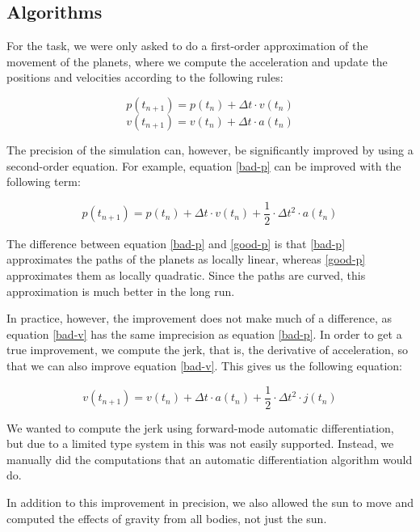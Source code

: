 \documentclass[a4paper]{article}
\begin{document}
\subsection{Algorithms}

For the task, we were only asked to do a first-order approximation of the movement of the planets, where we compute the acceleration and update the positions and velocities according to the following rules:

\begin{equation} \label{bad-p}
p(t_{n+1}) = p(t_n) + \Delta t \cdot v(t_n)
\end{equation}
\begin{equation} \label{bad-v}
v(t_{n+1}) = v(t_n) + \Delta t \cdot a(t_n)
\end{equation}

The precision of the simulation can, however, be significantly improved by using a second-order equation. For example, equation \ref{bad-p} can be improved with the following term:

\begin{equation} \label{good-p}
p(t_{n+1}) = p(t_n) + \Delta t \cdot v(t_n) + \frac{1}{2} \cdot \Delta t^2 \cdot a(t_n)
\end{equation}

The difference between equation \ref{bad-p} and \ref{good-p} is that \ref{bad-p} approximates the paths of the planets as locally linear, whereas \ref{good-p} approximates them as locally quadratic. Since the paths are curved, this approximation is much better in the long run.

In practice, however, the improvement does not make much of a difference, as equation \ref{bad-v} has the same imprecision as equation \ref{bad-p}. In order to get a true improvement, we compute the jerk, that is, the derivative of acceleration, so that we can also improve equation \ref{bad-v}. This gives us the following equation:

\begin{equation} \label{good-v}
v(t_{n+1}) = v(t_n) + \Delta t \cdot a(t_n) + \frac{1}{2} \cdot \Delta t^2 \cdot j(t_n)
\end{equation}

We wanted to compute the jerk using forward-mode automatic differentiation, but due to a limited type system in \Fsh this was not easily supported. Instead, we manually did the computations that an automatic differentiation algorithm would do.

In addition to this improvement in precision, we also allowed the sun to move and computed the effects of gravity from all bodies, not just the sun.
\end{document}
